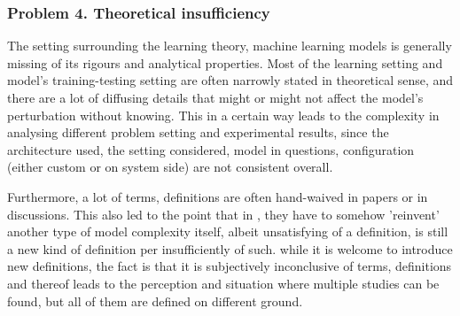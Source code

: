 \subsubsection*{Problem 4. Theoretical insufficiency}

The setting surrounding the learning theory, machine learning models is generally missing of its rigours and analytical properties. Most of the learning setting and model's training-testing setting are often narrowly stated in theoretical sense, and there are a lot of diffusing details that might or might not affect the model's perturbation without knowing. This in a certain way leads to the complexity in analysing different problem setting and experimental results, since the architecture used, the setting considered, model in questions, configuration (either custom or on system side) are not consistent overall. 

Furthermore, a lot of terms, definitions are often hand-waived in papers or in discussions. This also led to the point that in \cite{nakkiran_deep_2019}, they have to somehow 'reinvent' another type of model complexity itself, albeit unsatisfying of a definition, is still a new kind of definition per insufficiently of such. while it is welcome to introduce new definitions, the fact is that it is subjectively inconclusive of terms, definitions and thereof leads to the perception and situation where multiple studies can be found, but all of them are defined on different ground.

